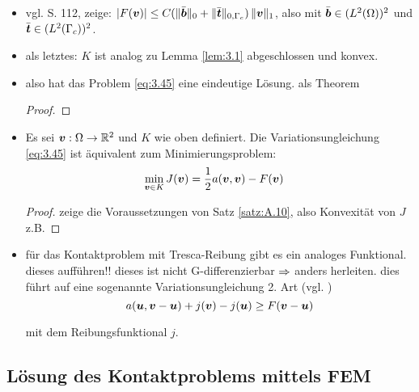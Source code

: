 \begin{itemize}
\item vgl. \cite{KikOden} S. 112, zeige: $\lvert F(\boldsymbol v)\rvert \le C(\lVert \bar{\boldsymbol b}\rVert_0+\lVert \bar{\boldsymbol t}\rVert_{0,\Gamma_c})\, \lVert \boldsymbol v\rVert_1$, also mit $\bar{\boldsymbol b} \in (L^2(\Omega))^2$ und $\bar{\boldsymbol t} \in (L^2(\Gamma_c))^2$.

\item als letztes: $K$ ist analog zu Lemma \ref{lem:3.1} abgeschlossen und konvex.

\item also hat das Problem \eqref{eq:3.45} eine eindeutige Lösung. als Theorem
\begin{theorem}

\end{theorem}

\begin{proof}

\end{proof}

\item 
\begin{theorem}
Es sei $\boldsymbol v : \Omega \rightarrow \mathbb{R}^2$ und $K$ wie oben definiert. Die Variationsungleichung \eqref{eq:3.45} ist äquivalent zum Minimierungsproblem:
\begin{align}
	\min_{\boldsymbol v \in K} J(\boldsymbol v)& = \frac 1 2 a(\boldsymbol v, \boldsymbol v)-F(\boldsymbol v)
\end{align}
\end{theorem}

\begin{proof}
zeige die Voraussetzungen von Satz \ref{satz:A.10}, also Konvexität von $J$ z.B.
\end{proof}

\item 
\begin{bem}
für das Kontaktproblem mit Tresca-Reibung gibt es ein analoges Funktional. dieses aufführen!! dieses ist nicht G-differenzierbar $\Rightarrow$ anders herleiten. dies führt auf eine sogenannte  Variationsungleichung 2. Art (vgl. \cite{EPSContact})
\[
	a(\boldsymbol u, \boldsymbol v-\boldsymbol u) + j(\boldsymbol v) -  j(\boldsymbol u) \ge F(\boldsymbol v-\boldsymbol u)
\]
\end{bem}
mit dem Reibungsfunktional $j$.
\end{itemize}






\subsection{Lösung des Kontaktproblems mittels FEM}
\label{kap:3.2.3}


